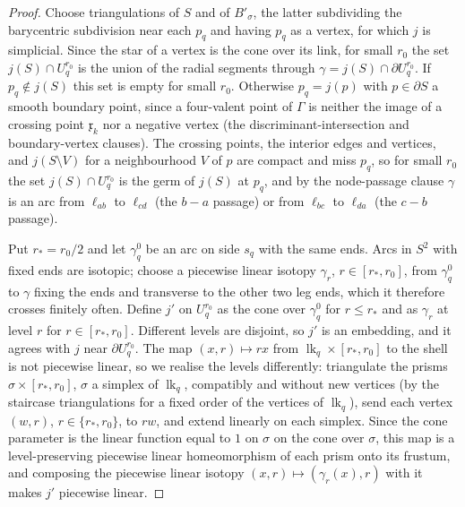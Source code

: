 \begin{proof}
Choose triangulations of $S$ and of $B'_\sigma$, the latter subdividing the barycentric subdivision near each $p_q$ and having
$p_q$ as a vertex, for which $j$ is simplicial. Since the star of a vertex is the cone over its link, for small $r_0$ the set
$j(S)\cap U^{r_0}_q$ is the union of the radial segments through $\gamma=j(S)\cap\partial U^{r_0}_q$. If $p_q\notin j(S)$
this set is empty for small $r_0$. Otherwise $p_q=j(p)$ with $p\in\partial S$ a smooth boundary point, since a four-valent
point of $\Gamma$ is neither the image of a crossing point $\mathfrak x_k$ nor a negative vertex (the discriminant-intersection and boundary-vertex clauses). The
crossing points, the interior edges and vertices, and $j(S\setminus V)$ for a neighbourhood $V$ of $p$ are compact and miss
$p_q$, so for small $r_0$ the set $j(S)\cap U_q^{r_0}$ is the germ of $j(S)$ at $p_q$, and by the node-passage clause $\gamma$ is an arc from
$\ell_{ab}$ to $\ell_{cd}$ (the $b-a$ passage) or from $\ell_{bc}$ to $\ell_{da}$ (the $c-b$ passage).

Put $r_*=r_0/2$ and let $\gamma^0_q$ be an arc on side $s_q$ with the same ends. Arcs in $S^2$ with fixed ends are
isotopic; choose a piecewise linear isotopy $\gamma_r$, $r\in[r_*,r_0]$, from $\gamma^0_q$ to $\gamma$ fixing the ends and
transverse to the other two leg ends, which it therefore crosses finitely often. Define $j'$ on $U^{r_0}_q$ as the cone over
$\gamma^0_q$ for $r\le r_*$ and as $\gamma_r$ at level $r$ for $r\in[r_*,r_0]$. Different levels are disjoint, so $j'$ is an
embedding, and it agrees with $j$ near $\partial U^{r_0}_q$. The map $(x,r)\mapsto rx$ from
$\operatorname{lk}_q\times[r_*,r_0]$ to the shell is not piecewise linear, so we realise the levels differently: triangulate
the prisms $\sigma\times[r_*,r_0]$, $\sigma$ a simplex of $\operatorname{lk}_q$, compatibly and without new vertices (by the
staircase triangulations for a fixed order of the vertices of $\operatorname{lk}_q$), send each
vertex $(w,r)$, $r\in\{r_*,r_0\}$, to $rw$, and extend linearly on each simplex. Since the cone parameter is the linear
function equal to $1$ on $\sigma$ on the cone over $\sigma$, this map is a level-preserving piecewise linear homeomorphism of
each prism onto its frustum, and composing the piecewise linear isotopy $(x,r)\mapsto(\gamma_r(x),r)$ with it makes $j'$
piecewise linear.


\end{proof}
